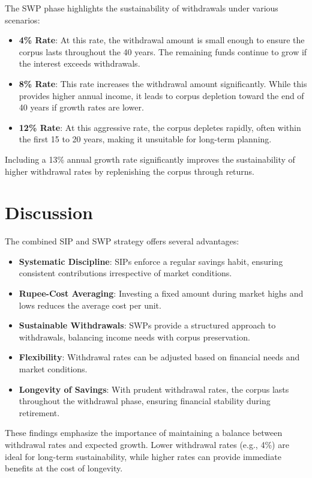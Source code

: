 \documentclass[a4paper,12pt]{article}
\begin{document}
		
		The SWP phase highlights the sustainability of withdrawals under various scenarios:
		\begin{itemize}
			\item \textbf{4\% Rate}: At this rate, the withdrawal amount is small enough to ensure the corpus lasts throughout the 40 years. The remaining funds continue to grow if the interest exceeds withdrawals.
			\item \textbf{8\% Rate}: This rate increases the withdrawal amount significantly. While this provides higher annual income, it leads to corpus depletion toward the end of 40 years if growth rates are lower.
			\item \textbf{12\% Rate}: At this aggressive rate, the corpus depletes rapidly, often within the first 15 to 20 years, making it unsuitable for long-term planning.
		\end{itemize}
		
		Including a 13\% annual growth rate significantly improves the sustainability of higher withdrawal rates by replenishing the corpus through returns.
		
		\section{Discussion}
		The combined SIP and SWP strategy offers several advantages:
		\begin{itemize}
			\item \textbf{Systematic Discipline}: SIPs enforce a regular savings habit, ensuring consistent contributions irrespective of market conditions.
			\item \textbf{Rupee-Cost Averaging}: Investing a fixed amount during market highs and lows reduces the average cost per unit.
			\item \textbf{Sustainable Withdrawals}: SWPs provide a structured approach to withdrawals, balancing income needs with corpus preservation.
			\item \textbf{Flexibility}: Withdrawal rates can be adjusted based on financial needs and market conditions.
			\item \textbf{Longevity of Savings}: With prudent withdrawal rates, the corpus lasts throughout the withdrawal phase, ensuring financial stability during retirement.
		\end{itemize}
		
		These findings emphasize the importance of maintaining a balance between withdrawal rates and expected growth. Lower withdrawal rates (e.g., 4\%) are ideal for long-term sustainability, while higher rates can provide immediate benefits at the cost of longevity.
		
\end{document}
